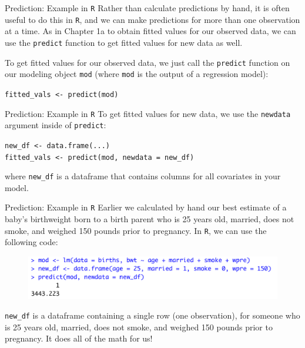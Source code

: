 \documentclass[10pt,t]{beamer}
\begin{document}
\begin{frame}{Prediction: Example in \texttt{R}}
Rather than calculate predictions by hand, it is often useful to do this in \texttt{R}, and we can make predictions for more than one observation at a time. As in Chapter 1a to obtain fitted values for our observed data, we can use the \texttt{predict} function to get fitted values for new data as well.

\vspace{0.3cm}

To get fitted values for our observed data, we just call the \texttt{predict} function on our modeling object \texttt{mod} (where \texttt{mod} is the output of a regression model):

\vspace{0.3cm}

\texttt{fitted\_vals <- predict(mod)}
\end{frame}

\begin{frame}{Prediction: Example in \texttt{R}}
To get fitted values for new data, we use the \texttt{newdata} argument inside of \texttt{predict}:

\vspace{0.3cm}

\texttt{new\_df <- data.frame(...)} \\
\texttt{fitted\_vals <- predict(mod, newdata = new\_df)}

\vspace{0.3cm}

where \texttt{new\_df} is a dataframe that contains columns for all covariates in your model.

\end{frame}

\begin{frame}{Prediction: Example in \texttt{R}}
Earlier we calculated by hand our best estimate of a baby's birthweight born to a birth parent who is 25 years old, married, does not smoke, and weighed 150 pounds prior to pregnancy. In \texttt{R}, we can use the following code:

\vspace{0.3cm}

\begin{figure}
	\centering \includegraphics[scale=0.5]{newdata_example.png}
\end{figure}

\vspace{0.3cm}

\texttt{new\_df} is a dataframe containing a single row (one observation), for someone who is 25 years old, married, does not smoke, and weighed 150 pounds prior to pregnancy. It does all of the math for us!

\end{frame}
\end{document}
